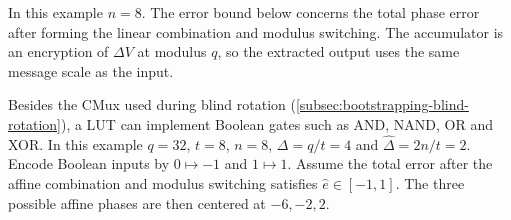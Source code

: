In this example $n=8$. The error bound below concerns the total phase error after forming the linear combination and modulus switching. The accumulator is an encryption of $\Delta V$ at modulus $q$, so the extracted output uses the same message scale as the input.

Besides the CMux used during blind rotation (\autoref{subsec:bootstrapping-blind-rotation}), a LUT can implement Boolean gates such as AND, NAND, OR and XOR. In this example $q=32$, $t=8$, $n=8$, $\Delta=q/t=4$ and $\hat\Delta=2n/t=2$. Encode Boolean inputs by $0\mapsto-1$ and $1\mapsto1$. Assume the total error after the affine combination and modulus switching satisfies $\hat e\in[-1,1]$. The three possible affine phases are then centered at $-6,-2,2$.


\begin{table}[ht]
  \centering
  \caption{An example truth table for an AND operation with an additional encoding.}
  \label{tab:gate-and}
\end{table}


